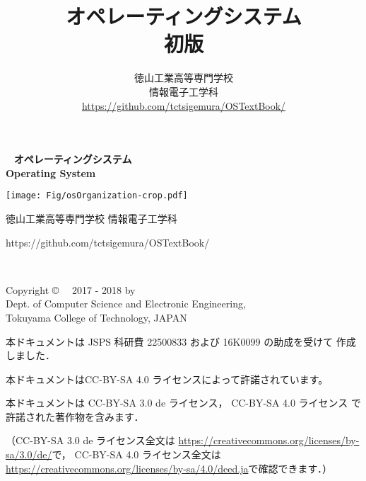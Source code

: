\documentclass[a4paper,11pt,twocolumn]{ltjsbook}     %
\newcommand{\ver}{初版}
\begin{document}
\setcounter{page}{0}
\thispagestyle{empty}
\onecolumn
~
\vfill
\vfill
{\noindent
\fontsize{34pt}{50pt}\selectfont\textbf{オペレーティングシステム}\\
\fontsize{34pt}{50pt}\selectfont\textbf{Operating System}
}
\vfill
\vfill
\centerline{
  \texttt{[image: Fig/osOrganization-crop.pdf]}
}
\vfill
\vfill
\centerline{\Large 徳山工業高等専門学校 情報電子工学科}
\centerline{\Large\ttfamily https://github.com/tctsigemura/OSTextBook/}
\vfill

\frontmatter
\title{オペレーティングシステム\\{\ver}}
\author{徳山工業高等専門学校\\情報電子工学科\\
\url{https://github.com/tctsigemura/OSTextBook/}}
\date{}
\maketitle

\thispagestyle{empty}
\onecolumn
~
\vfill
\begin{flushleft}
Copyright \copyright ~~ 2017 - 2018 by \\
Dept. of Computer Science and Electronic Engineering, \\
Tokuyama College of Technology, JAPAN
\end{flushleft}
\vspace{0.8cm}

本ドキュメントは JSPS 科研費 22500833 および 16K0099 の助成を受けて
作成しました．
\vspace{0.8cm}

本ドキュメントはCC-BY-SA 4.0 ライセンスによって許諾されています。

本ドキュメントは
CC-BY-SA 3.0 de ライセンス，
CC-BY-SA 4.0 ライセンス
で許諾された著作物を含みます．

（CC-BY-SA 3.0 de ライセンス全文は
\url{https://creativecommons.org/licenses/by-sa/3.0/de/}で，
CC-BY-SA 4.0 ライセンス全文は
\url{https://creativecommons.org/licenses/by-sa/4.0/deed.ja}で確認できます．）

\setcounter{tocdepth}{2}
\tableofcontents
\end{document}
